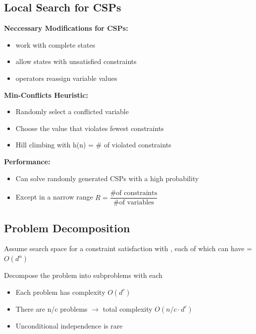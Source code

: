 \documentclass[
../../EiKI_Summary.tex,
]
{subfiles}
\begin{document}
\subsection{Local Search for CSPs}
\begin{minipage}
    [t]{0.5\textwidth}
    \textbf{Neccessary Modifications for CSPs:}
    \begin{itemize}
        \item work with complete states
        \item allow states with unsatisfied constraints
        \item operators reassign variable values
    \end{itemize}
\end{minipage}
\begin{minipage}
    [t]{0.5\textwidth}
    \textbf{Min-Conflicts Heuristic:}
    \begin{itemize}
        \item Randomly select a conflicted variable
        \item Choose the value that violates fewest constraints
        \item Hill climbing with h(n) = \# of violated constraints
    \end{itemize}
\end{minipage}

\textbf{Performance:}
\begin{itemize}
    \item Can solve randomly generated CSPs with a high probability
    \item Except in a narrow range $R = \dfrac{\text{\# of constraints}}{\text{\# of variables}}$
\end{itemize}

\subsection{Problem Decomposition}
Assume search space for a constraint satisfaction with , each of which can have  = $O(d^n)$

Decompose the problem into subproblems with  each
\begin{itemize}
    \item Each problem has complexity $O(d^c)$
    \item There are n/c problems $\rightarrow$ total complexity $O(n/c\cdot d^c)$
    \item Unconditional independence is rare
\end{itemize}
\end{document}
